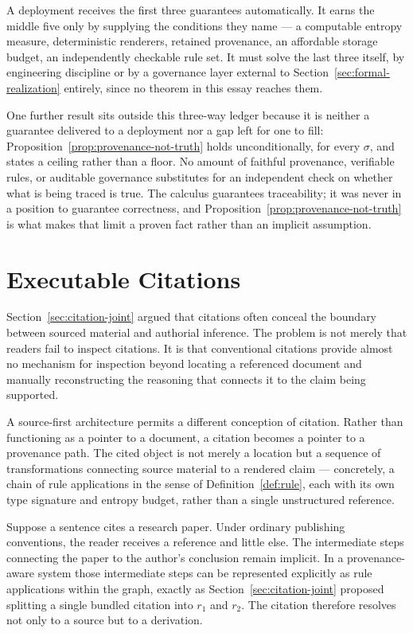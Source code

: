 \documentclass[11pt]{article}
\theoremstyle{definition}
\begin{document}
A deployment receives the first three guarantees automatically. It earns the middle five only by supplying the conditions they name --- a computable entropy measure, deterministic renderers, retained provenance, an affordable storage budget, an independently checkable rule set. It must solve the last three itself, by engineering discipline or by a governance layer external to Section~\ref{sec:formal-realization} entirely, since no theorem in this essay reaches them.

One further result sits outside this three-way ledger because it is neither a guarantee delivered to a deployment nor a gap left for one to fill: Proposition~\ref{prop:provenance-not-truth} holds unconditionally, for every $\sigma$, and states a ceiling rather than a floor. No amount of faithful provenance, verifiable rules, or auditable governance substitutes for an independent check on whether what is being traced is true. The calculus guarantees traceability; it was never in a position to guarantee correctness, and Proposition~\ref{prop:provenance-not-truth} is what makes that limit a proven fact rather than an implicit assumption.

\section{Executable Citations}
\label{sec:executable-citations}

Section~\ref{sec:citation-joint} argued that citations often conceal the boundary between sourced material and authorial inference. The problem is not merely that readers fail to inspect citations. It is that conventional citations provide almost no mechanism for inspection beyond locating a referenced document and manually reconstructing the reasoning that connects it to the claim being supported.

A source-first architecture permits a different conception of citation. Rather than functioning as a pointer to a document, a citation becomes a pointer to a provenance path. The cited object is not merely a location but a sequence of transformations connecting source material to a rendered claim --- concretely, a chain of rule applications in the sense of Definition~\ref{def:rule}, each with its own type signature and entropy budget, rather than a single unstructured reference.

Suppose a sentence cites a research paper. Under ordinary publishing conventions, the reader receives a reference and little else. The intermediate steps connecting the paper to the author's conclusion remain implicit. In a provenance-aware system those intermediate steps can be represented explicitly as rule applications within the graph, exactly as Section~\ref{sec:citation-joint} proposed splitting a single bundled citation into $r_1$ and $r_2$. The citation therefore resolves not only to a source but to a derivation.
\end{document}
